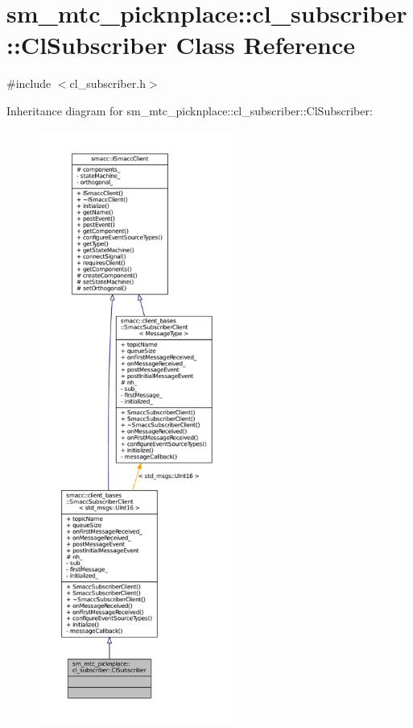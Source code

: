 \hypertarget{classsm__mtc__picknplace_1_1cl__subscriber_1_1ClSubscriber}{}\section{sm\+\_\+mtc\+\_\+picknplace\+:\+:cl\+\_\+subscriber\+:\+:Cl\+Subscriber Class Reference}
\label{classsm__mtc__picknplace_1_1cl__subscriber_1_1ClSubscriber}


{\ttfamily \#include $<$cl\+\_\+subscriber.\+h$>$}



Inheritance diagram for sm\+\_\+mtc\+\_\+picknplace\+:\+:cl\+\_\+subscriber\+:\+:Cl\+Subscriber\+:
\nopagebreak
\begin{figure}[H]
\begin{center}
\leavevmode
\includegraphics[height=550pt]{classsm__mtc__picknplace_1_1cl__subscriber_1_1ClSubscriber__inherit__graph}
\end{center}
\end{figure}



